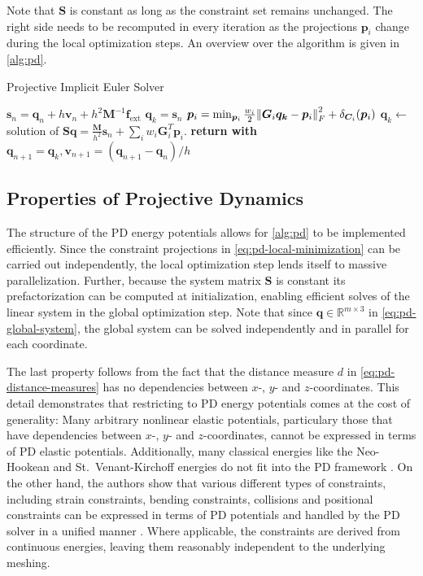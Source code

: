 Note that $\bm{S}$ is constant as long as the constraint set remains unchanged. The right side needs to be recomputed in every 
iteration as the projections $\bm{p}_i$ change during the local optimization steps.  An overview over the algorithm is given in \cref{alg:pd}.

\begin{algorithm}
\caption{Projective Implicit Euler Solver}\label{alg:pd}
\begin{algorithmic}
\State $\bm{s}_n = \bm{q}_n + h\bm{v}_n + h^2\bm{M}^{-1}\bm{f}_{\text{ext}}$
\State $\bm{q}_k = \bm{s}_n$
\State $\bm{p}_i = \min_{\bm{p}_i} \frac{w_i}{2}\norm{\bm{G}_i\bm{q_k} - \bm{p}_i}^2_F + \delta_{\bm{C}_i}(\bm{p}_i)$
\EndFor
\State $\bm{q}_{k} \gets$ solution of $\bm{S}\bm{q} = \frac{\bm{M}}{h^2}\bm{s}_n + \sum_i w_i \bm{G}_i^T \bm{p}_i$.
\EndFor
\State \textbf{return with } $\bm{q}_{n+1} = \bm{q}_k, \bm{v}_{n+1} = (\bm{q}_{n+1} - \bm{q}_n) / h$
\EndProcedure
\end{algorithmic}
\end{algorithm}

\subsection{Properties of Projective Dynamics}\label{ss:pd-properties}
The structure of the PD energy potentials allows for \cref{alg:pd} to be implemented efficiently. Since the constraint projections
in \cref{eq:pd-local-minimization} can be carried out independently, the local optimization step lends itself to massive parallelization. 
Further, because the system matrix $\bm{S}$ is constant its prefactorization can be computed at initialization, enabling
efficient solves of the linear system in the global optimization step. Note that since $\bm{q} \in \mathbb{R}^{m \times 3}$ in \cref{eq:pd-global-system}, 
the global system can be solved independently and in parallel for each coordinate.

The last property follows from the fact that the distance measure $d$ in \cref{eq:pd-distance-measures} has no dependencies between 
$x$-, $y$- and $z$-coordinates. This detail demonstrates that restricting to PD energy potentials comes at the cost of generality: 
Many arbitrary nonlinear elastic potentials, particulary those that have dependencies between $x$-, $y$- and $z$-coordinates, cannot be expressed 
in terms of PD elastic potentials. Additionally, many classical energies like the Neo-Hookean and St.\ Venant-Kirchoff energies do not fit 
into the PD framework \cite{liu2017}. On the other hand, the authors show that various different types of constraints, including strain constraints, 
bending constraints, collisions and positional constraints can be expressed in terms of PD potentials and handled by the PD solver in a 
unified manner \cite{bouaziz2014}. Where applicable, the constraints are derived from continuous energies, leaving them reasonably independent 
to the underlying meshing.

